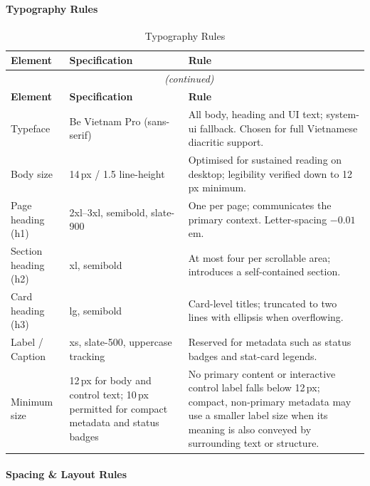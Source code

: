 \paragraph{Typography Rules}

\begin{longtable}{|p{}|p{}|p{}|}
  \caption{Typography Rules} \label{tab:typography_rules} \\
  \hline
  \textbf{Element} & \textbf{Specification} & \textbf{Rule} \\
  \hline
  \endfirsthead
  \multicolumn{3}{c}{\small\tablename~\thetable{} \textit{(continued)}} \\
  \hline
  \textbf{Element} & \textbf{Specification} & \textbf{Rule} \\
  \hline
  \endhead
  \hline
  \endfoot
  Typeface & Be Vietnam Pro (sans-serif) & All body, heading and UI text; system-ui fallback. Chosen for full Vietnamese diacritic support. \\
  \hline
  Body size & 14\,px / 1.5 line-height & Optimised for sustained reading on desktop; legibility verified down to 12\,px minimum. \\
  \hline
  Page heading (h1) & 2xl--3xl, semibold, slate-900 & One per page; communicates the primary context. Letter-spacing $-0.01$em. \\
  \hline
  Section heading (h2) & xl, semibold & At most four per scrollable area; introduces a self-contained section. \\
  \hline
  Card heading (h3) & lg, semibold & Card-level titles; truncated to two lines with ellipsis when overflowing. \\
  \hline
  Label / Caption & xs, slate-500, uppercase tracking & Reserved for metadata such as status badges and stat-card legends. \\
  \hline
  Minimum size & 12\,px for body and control text; 10\,px permitted for compact metadata and status badges & No primary content or interactive control label falls below 12\,px; compact, non-primary metadata may use a smaller label size when its meaning is also conveyed by surrounding text or structure. \\
  \hline
\end{longtable}

\paragraph{Spacing \& Layout Rules}

